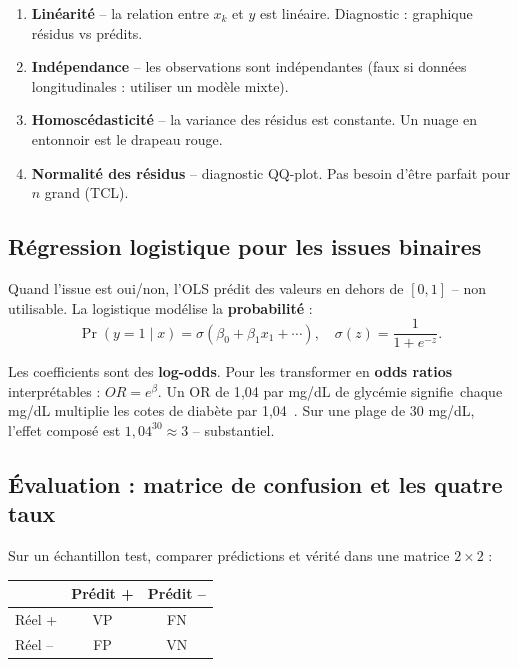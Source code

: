 \documentclass[11pt,a4paper]{article}
\providecommand{\og}{\guillemotleft\,}
\providecommand{\fg}{\,\guillemotright}
\begin{document}
\begin{enumerate}
  \item \textbf{Lin\'earit\'e} -- la relation entre $x_k$ et $y$ est
        lin\'eaire. Diagnostic : graphique r\'esidus vs pr\'edits.
  \item \textbf{Ind\'ependance} -- les observations sont ind\'ependantes
        (faux si donn\'ees longitudinales : utiliser un mod\`ele mixte).
  \item \textbf{Homosc\'edasticit\'e} -- la variance des r\'esidus est
        constante. Un nuage en entonnoir est le drapeau rouge.
  \item \textbf{Normalit\'e des r\'esidus} -- diagnostic QQ-plot. Pas
        besoin d'\^etre parfait pour $n$ grand (TCL).
\end{enumerate}

\subsection{R\'egression logistique pour les issues binaires}

Quand l'issue est oui/non, l'OLS pr\'edit des valeurs en dehors de
$[0, 1]$ -- non utilisable. La logistique mod\'elise la
\textbf{probabilit\'e} :
\[
\Pr(y = 1 \mid x) = \sigma(\beta_0 + \beta_1 x_1 + \cdots),
\quad
\sigma(z) = \frac{1}{1 + e^{-z}}.
\]

Les coefficients sont des \textbf{log-odds}. Pour les transformer en
\textbf{odds ratios} interpr\'etables : $OR = e^{\beta}$. Un OR de 1{,}04
par mg/dL de glyc\'emie signifie \og chaque mg/dL multiplie les cotes de
diab\`ete par 1{,}04 \fg{}. Sur une plage de 30 mg/dL, l'effet compos\'e
est $1{,}04^{30} \approx 3$ -- substantiel.

\subsection{\'Evaluation : matrice de confusion et les quatre taux}

Sur un \'echantillon test, comparer pr\'edictions et v\'erit\'e dans une
matrice $2 \times 2$ :

\begin{center}
\begin{tabular}{lcc}
\toprule
                       & Pr\'edit + & Pr\'edit -- \\
\midrule
R\'eel +               & VP         & FN \\
R\'eel --              & FP         & VN \\
\bottomrule
\end{tabular}
\end{center}
\end{document}
